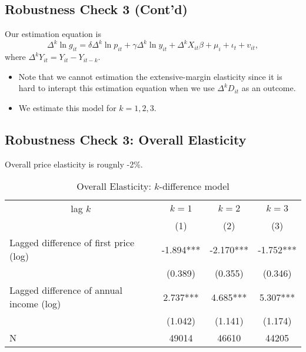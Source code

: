 \documentclass[ review  , 3p ]{elsarticle}
\providecommand{\tightlist}{%
  \setlength{\itemsep}{0pt}\setlength{\parskip}{0pt}}
\begin{document}
  \hypertarget{robustness-check-3-contd}{%
  \subsection{Robustness Check 3 (Cont'd)}\label{robustness-check-3-contd}}

  Our estimation equation is
  \[\Delta^k \ln g_{it} = \delta \Delta^k \ln p_{it} + \gamma \Delta^k \ln y_{it} + \Delta^k X_{it} \beta + \mu_i + \iota_t + v_{it},\]
  where \(\Delta^k Y_{it} = Y_{it} - Y_{it-k}\).

  \begin{itemize}
  \tightlist
  \item
    Note that we cannot estimation the extensive-margin elasticity since it is hard to interapt this estimation equation when we use \(\Delta^k D_{it}\) as an outcome.
  \item
    We estimate this model for \(k = 1, 2, 3\).
  \end{itemize}

  \hypertarget{robustness-check-3-overall-elasticity}{%
  \subsection{Robustness Check 3: Overall Elasticity}\label{robustness-check-3-overall-elasticity}}

  Overall price elasticity is rougnly -2\%.

  \begin{table}

  \caption{\label{tab:kablekDiffElasticitySlide1}Overall Elasticity: $k$-difference model}
  \centering
  \fontsize{8}{10}\selectfont
  \begin{tabular}[t]{lccc}
  \toprule
  \multicolumn{1}{c}{lag $k$} & \multicolumn{1}{c}{$k = 1$} & \multicolumn{1}{c}{$k = 2$} & \multicolumn{1}{c}{$k = 3$} \\
  \cmidrule(l{3pt}r{3pt}){1-1} \cmidrule(l{3pt}r{3pt}){2-2} \cmidrule(l{3pt}r{3pt}){3-3} \cmidrule(l{3pt}r{3pt}){4-4}
   & (1) & (2) & (3)\\
  \midrule
  Lagged difference of first price (log) & -1.894*** & -2.170*** & -1.752***\\
   & (0.389) & (0.355) & (0.346)\\
  Lagged difference of annual income (log) & 2.737*** & 4.685*** & 5.307***\\
   & (1.042) & (1.141) & (1.174)\\
  N & 49014 & 46610 & 44205\\
  \bottomrule
  \end{tabular}
  \end{table}
\end{document}
